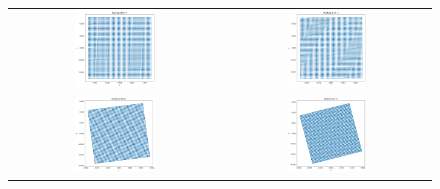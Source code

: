 \documentclass[a4paper,12pt]{article}
\begin{document}
\thispagestyle{empty}

{}

\begin{figure}
  \centering
  \begin{tabular}{cc}
    \includegraphics[width=0.4\textwidth]{../notes/rechteck_pre_1.png}
    &
    \includegraphics[width=0.4\textwidth]{../notes/rechteck_pre_2.png}\\
    \includegraphics[width=0.4\textwidth]{../notes/rechteck_at.png}
    &
    \includegraphics[width=0.4\textwidth]{../notes/rechteck_post_1.png}\\

\end{tabular}
\end{figure}
\end{document}
